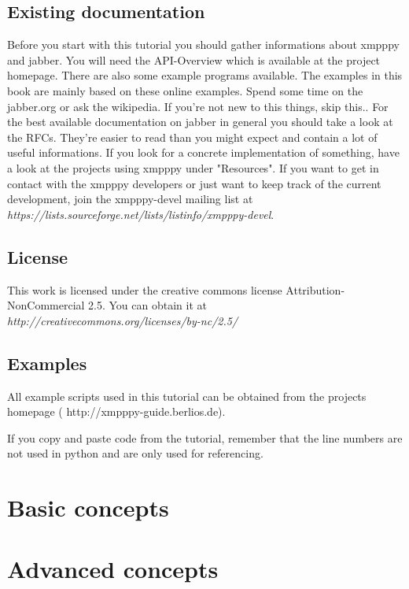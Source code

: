 \documentclass[a4paper,10pt]{report}
\begin{document}
\section{Existing documentation}
Before you start with this tutorial you should gather informations about xmpppy and jabber.
You will need the API-Overview which is available at the project homepage. There are also some example programs available. The examples in this book are mainly based on these online examples.
\newline
\newline
Spend some time on the jabber.org or ask the wikipedia. If you're not new to this things, skip this..
\newline
\newline
For the best available documentation on jabber in general you should take a look at the RFCs. They're easier to read than you might expect and contain a lot of useful informations.
\newline
\newline
If you look for a concrete implementation of something, have a look at the projects using xmpppy under "Resources".
\newline
\newline
If you want to get in contact with the xmpppy developers or just want to keep track of the current development, join the xmpppy-devel mailing list at \textit{https://lists.sourceforge.net/lists/listinfo/xmpppy-devel}.

\section{License}

This work is licensed under the creative commons license Attribution-NonCommercial 2.5.
You can obtain it at \textit{http://creativecommons.org/licenses/by-nc/2.5/}

\section{Examples}

All example scripts used in this tutorial can be obtained from the projects homepage ( http://xmpppy-guide.berlios.de).

If you copy and paste code from the tutorial, remember that the line numbers are not used in python
and are only used for referencing.





\chapter{Basic concepts}






\chapter{Advanced concepts}





\newpage
\end{document}
